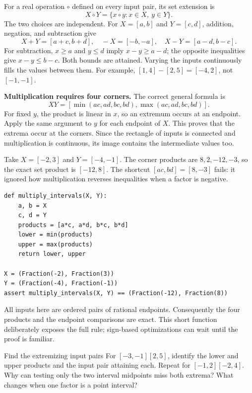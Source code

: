 \newpage
{}
For a real operation $\circ$ defined on every input pair, its set extension is
\[
 X\circ Y=\{x\circ y:x\in X,\ y\in Y\}.
\]
The two choices are independent. For $X=[a,b]$ and $Y=[c,d]$, addition,
negation, and subtraction give
\[
 X+Y=[a+c,b+d],\quad -X=[-b,-a],\quad X-Y=[a-d,b-c].
\]
For subtraction, $x\ge a$ and $y\le d$ imply $x-y\ge a-d$; the opposite
inequalities give $x-y\le b-c$. Both bounds are attained. Varying the inputs
continuously fills the values between them. For example,
$[1,4]-[2,5]=[-4,2]$, not $[-1,-1]$.

\textbf{Multiplication requires four corners.} The correct general formula is
\[
 XY=[\min(ac,ad,bc,bd),\max(ac,ad,bc,bd)].
\]
For fixed $y$, the product is linear in $x$, so an extremum occurs at an endpoint.
Apply the same argument to $y$ for each endpoint of $X$. This proves that the
extrema occur at the corners. Since the rectangle of inputs is connected and
multiplication is continuous, its image contains the intermediate values too.

Take $X=[-2,3]$ and $Y=[-4,-1]$. The corner products are $8,2,-12,-3$,
so the exact set product is $[-12,8]$. The shortcut $[ac,bd]=[8,-3]$ fails:
it ignored how multiplication reverses inequalities when a factor is negative.
\begin{lstlisting}
def multiply_intervals(X, Y):
    a, b = X
    c, d = Y
    products = [a*c, a*d, b*c, b*d]
    lower = min(products)
    upper = max(products)
    return lower, upper

X = (Fraction(-2), Fraction(3))
Y = (Fraction(-4), Fraction(-1))
assert multiply_intervals(X, Y) == (Fraction(-12), Fraction(8))
\end{lstlisting}
All inputs here are ordered pairs of rational endpoints. Consequently the four
products and the endpoint comparisons are exact. This short function deliberately
exposes the full rule; sign-based optimizations can wait until the proof is familiar.

\begin{question}{Find the extremizing input pairs}
For $[-3,-1][2,5]$, identify the lower and upper products and the input pair
attaining each. Repeat for $[-1,2][-2,4]$. Why can testing only the two interval
midpoints miss both extrema? What changes when one factor is a point interval?
\end{question}

